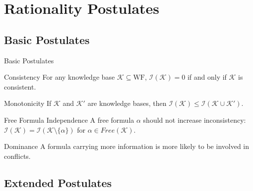 \section{Rationality Postulates}

\subsection{Basic Postulates}

\begin{frame}{Basic Postulates}
    \begin{block}{Consistency}
        For any knowledge base \( \mathcal{K} \subseteq \text{WF} \), \(\mathcal{I}(\mathcal{K}) = 0\) if and only if \( \mathcal{K} \) is consistent.
    \end{block}

    \begin{block}{Monotonicity}
        If \( \mathcal{K} \) and \( \mathcal{K}' \) are knowledge bases, then \(\mathcal{I}(\mathcal{K}) \leq \mathcal{I}(\mathcal{K} \cup \mathcal{K}')\).
    \end{block}

    \begin{block}{Free Formula Independence}
        A free formula \( \alpha \) should not increase inconsistency: \(\mathcal{I}(\mathcal{K}) = \mathcal{I}(\mathcal{K} \setminus \{\alpha\})\) for \( \alpha \in Free(\mathcal{K})\).
    \end{block}

    \begin{block}{Dominance}
        A formula carrying more information is more likely to be involved in conflicts.
    \end{block}
\end{frame}

\subsection{Extended Postulates}

